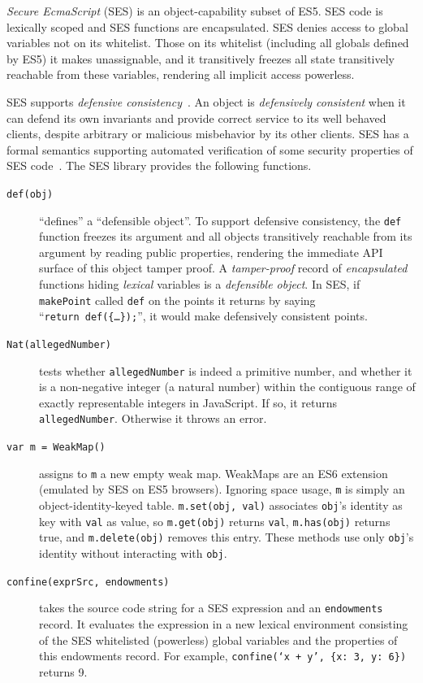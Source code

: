 \documentclass{llncs}
\begin{document}
\emph{Secure EcmaScript} (SES) is an object-capability subset of ES5. SES code is lexically scoped and SES functions are encapsulated. SES denies access to global variables not on its whitelist. Those on its whitelist (including all globals defined by ES5) it makes unassignable, and it transitively freezes all state transitively reachable from these variables, rendering all implicit access powerless. 

SES supports \emph{defensive consistency}~\cite{RobustComposition}. An object is \emph{defensively consistent} when it can defend its own invariants and provide correct service to its well behaved clients, despite arbitrary or malicious misbehavior by its other clients. SES has a formal semantics supporting automated verification of some security properties of SES code~\cite{taly2011automated}. The SES library provides the following functions.

\begin{description}
\item[{\tt def(obj)}]  ``defines'' a ``defensible object''. To support defensive consistency, the {\tt def} function freezes its argument and all objects transitively reachable from its argument by reading public properties, rendering the immediate API surface of this object tamper proof. A \emph{tamper-proof} record of \emph{encapsulated} functions hiding \emph{lexical} variables is a \emph{defensible object}. In SES, if {\tt makePoint} called {\tt def} on the points it returns by saying ``{\tt return~def(\{\ldots\});}'', it would make defensively consistent points.

\item[{\tt Nat(allegedNumber)}] tests whether {\tt allegedNumber} is indeed a primitive number, and whether it is a non-negative integer (a natural number) within the contiguous range of exactly representable integers in JavaScript. If so, it returns {\tt allegedNumber}. Otherwise it throws an error.

\item[{\tt var m = WeakMap()}] assigns to {\tt m} a new empty weak map. WeakMaps are an ES6 extension (emulated by SES on ES5 browsers). Ignoring space usage, {\tt m} is simply an object-identity-keyed table. {\tt m.set(obj, val)} associates {\tt obj}'s identity as key with {\tt val} as value, so {\tt m.get(obj)} returns {\tt val}, {\tt m.has(obj)} returns true, and {\tt m.delete(obj)} removes this entry. These methods use only {\tt obj}'s identity without interacting with {\tt obj}.

\item[{\tt confine(exprSrc, endowments)}] takes the source code string for a SES expression and an {\tt endowments} record. It evaluates the expression in a new lexical environment consisting of the SES whitelisted (powerless) global variables and the properties of this endowments record. For example, {\tt confine(`x~+~y',~\{x:~3,~y:~6\})} returns 9. 


\end{description}
\end{document}
